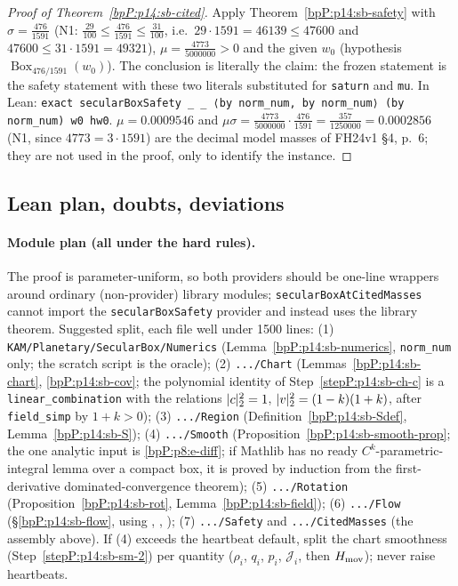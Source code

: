 \begin{proof}[Proof of Theorem~\ref{bpP:p14:sb-cited}]
\label{stepP:p14:sb-ci-1} Apply Theorem~\ref{bpP:p14:sb-safety} with $\sigma=\frac{476}{1591}$ (N1: $\frac{29}{100}\le\frac{476}{1591}\le\frac{31}{100}$, i.e.\ $29\cdot1591=46139\le47600$ and $47600\le31\cdot1591=49321$), $\mu=\frac{4773}{5000000}>0$ and the given $w_0$ (hypothesis $\operatorname{Box}_{476/1591}(w_0)$). The conclusion is literally the claim: the frozen statement is the safety statement with these two literals substituted for \texttt{saturn} and \texttt{mu}. In Lean: \texttt{exact secularBoxSafety \_ \_ ⟨by norm\_num, by norm\_num⟩ (by norm\_num) w0 hw0}.
\label{stepP:p14:sb-ci-2} $\mu=0.0009546$ and $\mu\sigma=\frac{4773}{5000000}\cdot\frac{476}{1591}=\frac{357}{1250000}=0.0002856$ (N1, since $4773=3\cdot1591$) are the decimal model masses of FH24v1 \S4, p.~6; they are not used in the proof, only to identify the instance.
\end{proof}

\subsection{Lean plan, doubts, deviations}\label{bpP:p14:sb-notes}

\paragraph{Module plan (all under the hard rules).} The proof is parameter-uniform, so both providers should be one-line wrappers around ordinary (non-provider) library modules; \texttt{secularBoxAtCitedMasses} cannot import the \texttt{secularBoxSafety} provider and instead uses the library theorem. Suggested split, each file well under 1500 lines:
(1) \texttt{KAM/Planetary/SecularBox/Numerics} (Lemma~\ref{bpP:p14:sb-numerics}, \texttt{norm\_num} only; the scratch script is the oracle);
(2) \texttt{.../Chart} (Lemmas~\ref{bpP:p14:sb-chart}, \ref{bpP:p14:sb-cov}; the polynomial identity of Step~\ref{stepP:p14:sb-ch-c} is a \texttt{linear\_combination} with the relations $\lvert c\rvert_2^2=1$, $\lvert v\rvert_2^2=(1-k)(1+k)$, after \texttt{field\_simp} by $1+k>0$);
(3) \texttt{.../Region} (Definition~\ref{bpP:p14:sb-Sdef}, Lemma~\ref{bpP:p14:sb-S});
(4) \texttt{.../Smooth} (Proposition~\ref{bpP:p14:sb-smooth-prop}; the one analytic input is \ref{bpP:p8:e-diff}; if Mathlib has no ready $C^k$-parametric-integral lemma over a compact box, it is proved by induction from the first-derivative dominated-convergence theorem);
(5) \texttt{.../Rotation} (Proposition~\ref{bpP:p14:sb-rot}, Lemma~\ref{bpP:p14:sb-field});
(6) \texttt{.../Flow} (\S\ref{bpP:p14:sb-flow}, using , , );
(7) \texttt{.../Safety} and \texttt{.../CitedMasses} (the assembly above).
If (4) exceeds the heartbeat default, split the chart smoothness (Step~\ref{stepP:p14:sb-sm-2}) per quantity ($\rho_i$, $q_i$, $p_i$, $\mathcal J_i$, then $H_{\rm mov}$); never raise heartbeats.

